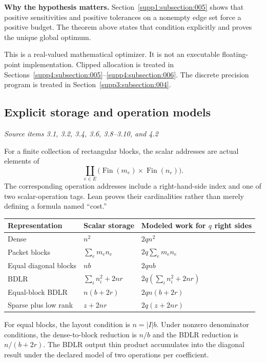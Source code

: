 \textbf{Why the hypothesis matters.} Section~\ref{supp1:subsection:005} shows that positive sensitivities and positive tolerances on a nonempty edge set force a positive budget. The theorem above states that condition explicitly and proves the unique global optimum.

This is a real-valued mathematical optimizer. It is not an executable floating-point implementation. Clipped allocation is treated in Sections~\ref{supp4:subsection:005}--\ref{supp4:subsection:006}. The discrete precision program is treated in Section~\ref{supp3:subsection:004}.



\subsection{Explicit storage and operation models}\label{supp2:subsection:005}\textit{Source items 3.1, 3.2, 3.4, 3.6, 3.8--3.10, and 4.2}\par
For a finite collection of rectangular blocks, the scalar addresses are actual elements of
\[
\coprod_{e\in E}\bigl(\operatorname{Fin}(m_e)\times\operatorname{Fin}(n_e)\bigr).
\]
The corresponding operation addresses include a right-hand-side index and one of two scalar-operation tags. Lean proves their cardinalities rather than merely defining a formula named ``cost.''

\begin{center}\small
\renewcommand{\arraystretch}{1.3}
\begin{tabular}{@{}lll@{}}
\toprule
Representation & Scalar storage & Modeled work for $q$ right sides\\
\midrule
Dense & $n^2$ & $2qn^2$\\
Packet blocks & $\sum_em_en_e$ & $2q\sum_em_en_e$\\
Equal diagonal blocks & $nb$ & $2qnb$\\
BDLR & $\sum_i n_i^2+2nr$ & $2q(\sum_i n_i^2+2nr)$\\
Equal-block BDLR & $n(b+2r)$ & $2qn(b+2r)$\\
Sparse plus low rank & $z+2nr$ & $2q(z+2nr)$\\
\bottomrule
\end{tabular}
\end{center}
For equal blocks, the layout condition is $n=|I|b$. Under nonzero denominator conditions, the dense-to-block reduction is $n/b$ and the BDLR reduction is $n/(b+2r)$. The BDLR output thin product accumulates into the diagonal result under the declared model of two operations per coefficient.

